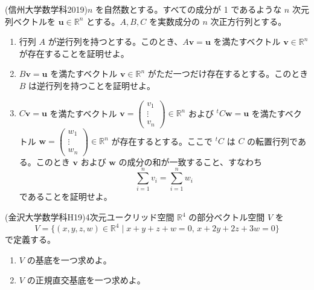 \documentclass[a4j,dvipdfmx]{jsarticle}
\begin{document}
    \clearpage
    \begin{screen}
        (信州大学数学科2019)$n$ を自然数とする。すべての成分が 1 であるような $n$ 次元列ベクトルを $\boldsymbol{u} \in \mathbb{R}^n$ とする。$A, B, C$ を実数成分の $n$ 次正方行列とする。
        \begin{enumerate}
            \item 行列 $A$ が逆行列を持つとする。このとき、$A\boldsymbol{v} = \boldsymbol{u}$ を満たすベクトル $\boldsymbol{v} \in \mathbb{R}^n$ が存在することを証明せよ。
            
            \item $B\boldsymbol{v} = \boldsymbol{u}$ を満たすベクトル $\boldsymbol{v} \in \mathbb{R}^n$ がただ一つだけ存在するとする。このとき $B$ は逆行列を持つことを証明せよ。
            
            \item $C\boldsymbol{v} = \boldsymbol{u}$ を満たすベクトル $\boldsymbol{v} = \begin{pmatrix} v_1 \\ \vdots \\ v_n \end{pmatrix} \in \mathbb{R}^n$ および ${}^tC\boldsymbol{w} = \boldsymbol{u}$ を満たすベクトル $\boldsymbol{w} = \begin{pmatrix} w_1 \\ \vdots \\ w_n \end{pmatrix} \in \mathbb{R}^n$ が存在するとする。ここで ${}^tC$ は $C$ の転置行列である。このとき $\boldsymbol{v}$ および $\boldsymbol{w}$ の成分の和が一致すること、すなわち
            \[
            \sum_{i=1}^n v_i = \sum_{i=1}^n w_i
            \]
            であることを証明せよ。
        \end{enumerate}
    \end{screen}
    \clearpage
    \begin{screen}
        (金沢大学数学科H19)4次元ユークリッド空間 $\mathbb{R}^4$ の部分ベクトル空間 $V$ を
        \[
        V = \{ (x, y, z, w) \in \mathbb{R}^4 \mid x + y + z + w = 0, \, x + 2y + 2z + 3w = 0 \}
        \]
        で定義する。

        \begin{enumerate}
            \item $V$ の基底を一つ求めよ。
            \item $V$ の正規直交基底を一つ求めよ。
        \end{enumerate}
    \end{screen}
\end{document}
